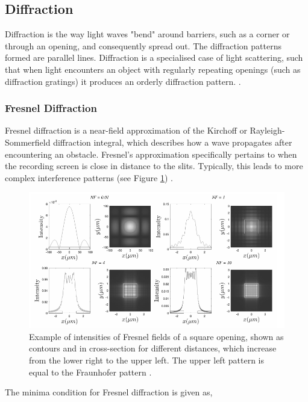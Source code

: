 \documentclass[12pt]{article}
\begin{document}
\subsection{Diffraction} \label{sec:1.2}

Diffraction is the way light waves "bend" around barriers, such as a corner or through an opening, and consequently spread out. The diffraction patterns formed are parallel lines.
Diffraction is a specialised case of light scattering, such that when light encounters an object with regularly repeating openings (such as diffraction gratings) it produces an orderly diffraction pattern.
\cite{diffraction1}. 

\subsubsection{Fresnel Diffraction}

Fresnel diffraction is a near-field approximation of the Kirchoff or Rayleigh-Sommerfield diffraction integral, which describes how a wave propagates after encountering an obstacle. Fresnel's approximation
specifically pertains to when the recording screen is close in distance to the slits. Typically, this leads to more complex interference patterns (see Figure \ref{fig:2}) \cite{fresnelfraunhofer}.

\begin{figure}[H]
    \centering
    \includegraphics[width=.85\textwidth]{fresnel patterns.png}
    \caption{Example of intensities of Fresnel fields of a square opening, shown as contours and in cross-section for different distances, which increase from the lower right to the upper left.
    The upper left pattern is equal to the Fraunhofer pattern \protect\cite{fresnelfraunhofer}.}
    \label{fig:2}
\end{figure}

The minima condition for Fresnel diffraction is given as,
\end{document}
